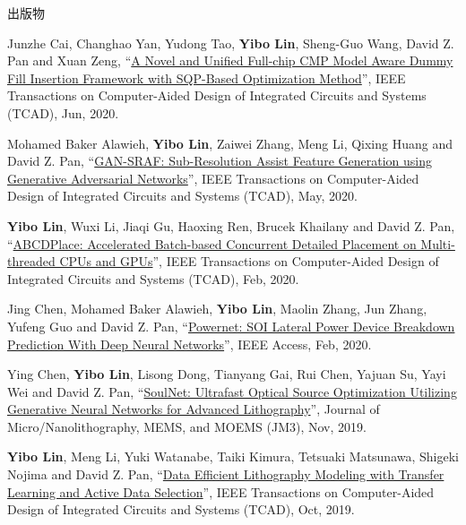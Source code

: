 \begin{rSection}{出版物}
\begin{description}[font=\normalfont, rightmargin=2em]
\item[{[J20]}]{
        Junzhe Cai, Changhao Yan, Yudong Tao, \textbf{Yibo Lin}, Sheng-Guo Wang, David Z. Pan and Xuan Zeng, 
    ``\href{https://doi.org/10.1109/TCAD.2020.3001380}{A Novel and Unified Full-chip CMP Model Aware Dummy Fill Insertion Framework with SQP-Based Optimization Method}'', 
    IEEE Transactions on Computer-Aided Design of Integrated Circuits and Systems (TCAD), Jun, 2020.
    
}
            

\item[{[J19]}]{
        Mohamed Baker Alawieh, \textbf{Yibo Lin}, Zaiwei Zhang, Meng Li, Qixing Huang and David Z. Pan, 
    ``\href{https://doi.org/10.1109/TCAD.2020.2995338}{GAN-SRAF: Sub-Resolution Assist Feature Generation using Generative Adversarial Networks}'', 
    IEEE Transactions on Computer-Aided Design of Integrated Circuits and Systems (TCAD), May, 2020.
    
}
            

\item[{[J18]}]{
        \textbf{Yibo Lin}, Wuxi Li, Jiaqi Gu, Haoxing Ren, Brucek Khailany and David Z. Pan, 
    ``\href{https://doi.org/10.1109/TCAD.2020.2971531}{ABCDPlace: Accelerated Batch-based Concurrent Detailed Placement on Multi-threaded CPUs and GPUs}'', 
    IEEE Transactions on Computer-Aided Design of Integrated Circuits and Systems (TCAD), Feb, 2020.
    
}
            

\item[{[J17]}]{
        Jing Chen, Mohamed Baker Alawieh, \textbf{Yibo Lin}, Maolin Zhang, Jun Zhang, Yufeng Guo and David Z. Pan, 
    ``\href{https://doi.org/10.1109/ACCESS.2020.2970966}{Powernet: SOI Lateral Power Device Breakdown Prediction With Deep Neural Networks}'', 
    IEEE Access, Feb, 2020.
    
}
            

\item[{[J16]}]{
        Ying Chen, \textbf{Yibo Lin}, Lisong Dong, Tianyang Gai, Rui Chen, Yajuan Su, Yayi Wei and David Z. Pan, 
    ``\href{https://dx.doi.org/10.1117/1.JMM.18.4.043506}{SoulNet: Ultrafast Optical Source Optimization Utilizing Generative Neural Networks for Advanced Lithography}'', 
    Journal of Micro/Nanolithography, MEMS, and MOEMS (JM3), Nov, 2019.
    
}
            

\item[{[J15]}]{
        \textbf{Yibo Lin}, Meng Li, Yuki Watanabe, Taiki Kimura, Tetsuaki Matsunawa, Shigeki Nojima and David Z. Pan, 
    ``\href{https://doi.org/10.1109/TCAD.2018.2864251}{Data Efficient Lithography Modeling with Transfer Learning and Active Data Selection}'', 
    IEEE Transactions on Computer-Aided Design of Integrated Circuits and Systems (TCAD), Oct, 2019.
    
}
\end{description}
\end{rSection}
